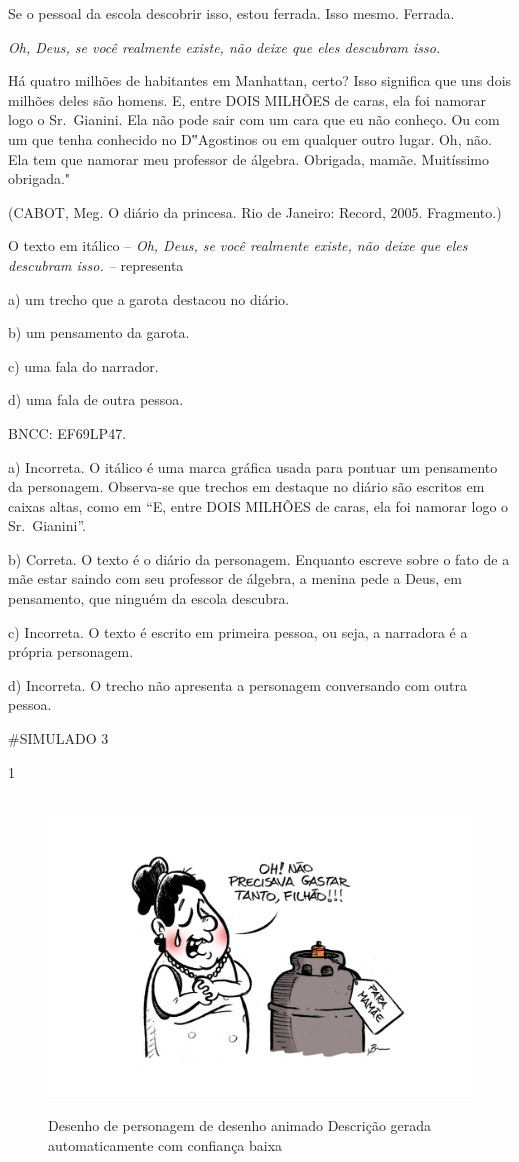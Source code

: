 {Se o pessoal da escola descobrir isso, estou ferrada. Isso mesmo.
Ferrada.

\emph{Oh, Deus, se você realmente existe, não deixe que eles descubram
isso.}

Há quatro milhões de habitantes em Manhattan, certo? Isso significa que
uns dois milhões deles são homens. E, entre DOIS MILHÕES de caras, ela
foi namorar logo o Sr.~Gianini. Ela não pode sair com um cara que eu não
conheço. Ou com um que tenha conhecido no D‟Agostinos ou em qualquer
outro lugar. Oh, não. Ela tem que namorar meu professor de álgebra.
Obrigada, mamãe. Muitíssimo obrigada."

(CABOT, Meg. O diário da princesa. Rio de Janeiro: Record, 2005.
Fragmento.)

O texto em itálico -- \emph{Oh, Deus, se você realmente existe, não
deixe que eles descubram isso. --} representa

a) um trecho que a garota destacou no diário.

b) um pensamento da garota.

c) uma fala do narrador.

d) uma fala de outra pessoa.

BNCC: EF69LP47.

a) Incorreta. O itálico é uma marca gráfica usada para pontuar um
pensamento da personagem. Observa-se que trechos em destaque no diário
são escritos em caixas altas, como em ``E, entre DOIS MILHÕES de caras,
ela foi namorar logo o Sr.~Gianini''.

b) Correta. O texto é o diário da personagem. Enquanto escreve sobre o
fato de a mãe estar saindo com seu professor de álgebra, a menina pede a
Deus, em pensamento, que ninguém da escola descubra.

c) Incorreta. O texto é escrito em primeira pessoa, ou seja, a narradora
é a própria personagem.

d) Incorreta. O trecho não apresenta a personagem conversando com outra
pessoa.

\#SIMULADO 3

\num{1}

\begin{figure}
\centering
\includegraphics[width=4.86098in,height=3.28333in]{./imgSAEB_6_POR/media/image39.png}
\caption{Desenho de personagem de desenho animado Descrição gerada
automaticamente com confiança baixa}
\end{figure}

}
